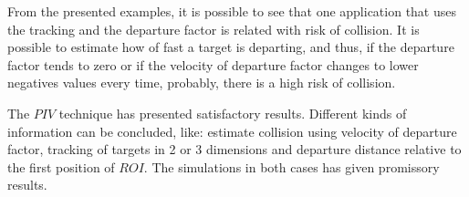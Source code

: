 From the presented examples,
it is possible to see that one application that uses the tracking
and the departure factor is related with risk of collision.
It is possible to estimate how of fast a target is departing,
and thus, if the  departure factor tends to zero or 
if the velocity of departure factor changes to lower negatives values every time, 
probably, there is a high risk of collision.

The $PIV$ technique has presented satisfactory results. 
Different kinds of information can be concluded, 
like: estimate collision using velocity of departure factor, 
tracking of targets in 2 or 3 dimensions and departure distance
relative to the first position of $ROI$. 
The simulations in both cases has given promissory results.
